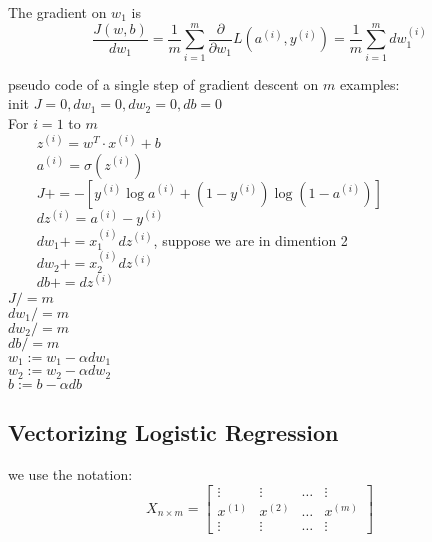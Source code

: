 The gradient on $w_1$ is $$ \dfrac{J(w, b)}{dw_1} = \dfrac{1}{m} \sum_{i = 1}^m \dfrac{\partial}{\partial w_1} L(a^{(i)}, y^{(i)}) = \dfrac{1}{m} \sum_{i = 1}^m dw^{(i)}_1 $$

pseudo code of a single step of gradient descent on $m$ examples: \\
init $J = 0, dw_1 = 0, dw_2 = 0, db = 0$ \\
For $i = 1$ to $m$ \\
\verb+    + $z^{(i)} = w^T \cdot x^{(i)} + b$ \\
\verb+    + $a^{(i)} = \sigma(z^{(i)})$ \\
\verb+    + $J += -[y^{(i)} \log a^{(i)} + (1 - y^{(i)}) \log (1 - a^{(i)})]$ \\
\verb+    + $dz^{(i)} = a^{(i)} - y^{(i)}$ \\
\verb+    + $dw_1 += x^{(i)}_1 dz^{(i)}$, suppose we are in dimention 2 \\
\verb+    + $dw_2 += x^{(i)}_2 dz^{(i)}$ \\
\verb+    + $db += dz^{(i)}$ \\
$J /= m$ \\
$dw_1 /= m$ \\
$dw_2 /= m$ \\
$db /= m$ \\
$w_1 := w_1 - \alpha dw_1$ \\
$w_2 := w_2 - \alpha dw_2$ \\
$b := b - \alpha db$

\subsection{Vectorizing Logistic Regression}
we use the notation:
$$
X_{n \times m} =
\begin{bmatrix}
	\vdots & \vdots & \ldots & \vdots \\
	x^{(1)} & x^{(2)} & \ldots & x^{(m)} \\
	\vdots & \vdots & \ldots & \vdots
\end{bmatrix}
$$

